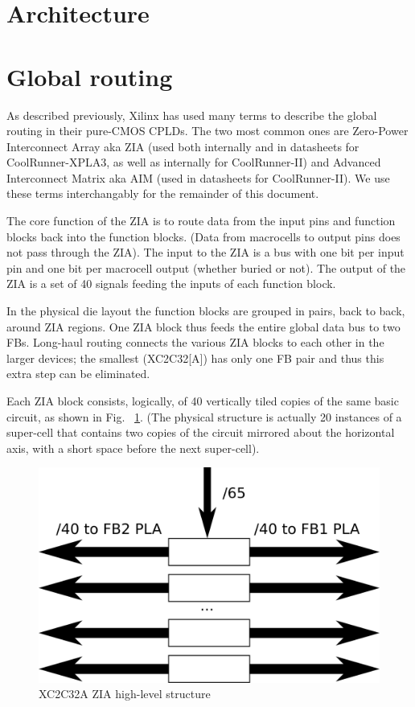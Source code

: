 \documentclass[pdftex,letterpaper]{article}
\begin{document}
\pagebreak
\section{Architecture}

\section{Global routing}

As described previously, Xilinx has used many terms to describe the global routing in their pure-CMOS CPLDs. 
The two most common ones are Zero-Power Interconnect Array aka ZIA (used both internally and in datasheets for 
CoolRunner-XPLA3, as well as internally for CoolRunner-II) and Advanced Interconnect Matrix aka AIM (used in 
datasheets for CoolRunner-II). We use these terms interchangably for the remainder of this document.

The core function of the ZIA is to route data from the input pins and function blocks back into the function 
blocks. (Data from macrocells to output pins does not pass through the ZIA). The input to the ZIA is a bus with 
one bit per input pin and one bit per macrocell output (whether buried or not). The output of the ZIA is a set of 
40 signals feeding the inputs of each function block.

In the physical die layout the function blocks are grouped in pairs, back to back, around ZIA regions. One ZIA 
block thus feeds the entire global data bus to two FBs. Long-haul routing connects the various ZIA blocks to each 
other in the larger devices; the smallest (XC2C32[A]) has only one FB pair and thus this extra step can be 
eliminated.

Each ZIA block consists, logically, of 40 vertically tiled copies of the same basic circuit, as shown in Fig. 
~\ref{xc2c32a-zia-block-only}. (The physical structure is actually 20 instances of a super-cell that contains two 
copies of the circuit mirrored about the horizontal axis, with a short space before the next super-cell).

\begin{figure}[h]
	\includegraphics[scale=1]{xc2c32a-zia-block-only.png}
	\caption{XC2C32A ZIA high-level structure}
	\label{xc2c32a-zia-block-only}
\end{figure}
\end{document}

